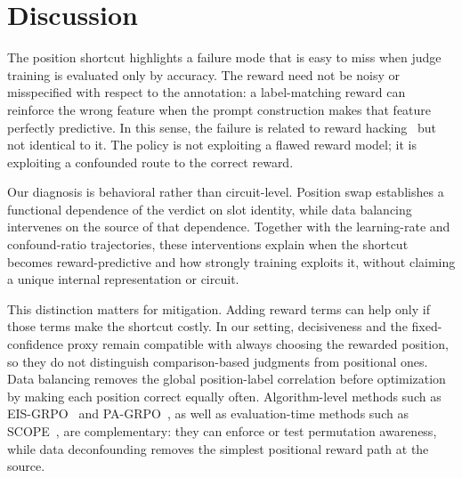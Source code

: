 \documentclass[letterpaper]{article}
\begin{document}
\begin{table}[H]
\centering
\scriptsize
\setlength{\tabcolsep}{2.5pt}
\caption{External check on public RL-trained judges. Both checkpoints show an original/swap accuracy gap and positive first-position bias among \mbox{inconsistent predictions}.}
\label{tab:judgelrm}
\end{table}

\section{Discussion}
\label{sec:discussion}

The position shortcut highlights a failure mode that is easy to miss when judge training is evaluated only by accuracy. The reward need not be noisy or misspecified with respect to the annotation: a label-matching reward can reinforce the wrong feature when the prompt construction makes that feature perfectly predictive. In this sense, the failure is related to reward hacking~\citep{skalse2022defining,gao2023scaling} but not identical to it. The policy is not exploiting a flawed reward model; it is exploiting a confounded route to the correct reward.

Our diagnosis is behavioral rather than circuit-level. Position swap establishes a functional dependence of the verdict on slot identity, while data balancing intervenes on the source of that dependence. Together with the learning-rate and confound-ratio trajectories, these interventions explain when the shortcut becomes reward-predictive and how strongly training exploits it, without claiming a unique internal representation or circuit.

This distinction matters for mitigation. Adding reward terms can help only if those terms make the shortcut costly. In our setting, decisiveness and the fixed-confidence proxy remain compatible with always choosing the rewarded position, so they do not distinguish comparison-based judgments from positional ones. Data balancing removes the global position-label correlation before optimization by making each position correct equally often. Algorithm-level methods such as EIS-GRPO~\citep{eisgrpo2026} and PA-GRPO~\citep{pagrpo2026}, as well as evaluation-time methods such as SCOPE~\citep{scope2026}, are complementary: they can enforce or test permutation awareness, while data deconfounding removes the simplest positional reward path at the source.
\end{document}
